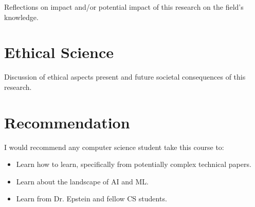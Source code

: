 \documentclass[12pt, letterpaper]{article}
\begin{document}
Reflections on impact and/or potential impact of this research on the field's knowledge.

\section{Ethical Science}
\label{sec:ethical}

Discussion of ethical aspects present and future societal consequences of this research.

\section{Recommendation}
\label{sec:rec}

I would recommend any computer science student take this course to:
\begin{itemize}
    \item Learn how to learn, specifically from potentially complex technical papers.
    \item Learn about the landscape of AI and ML.
    \item Learn from Dr. Epstein and fellow CS students.
\end{itemize}




% 
% 





\end{document}
